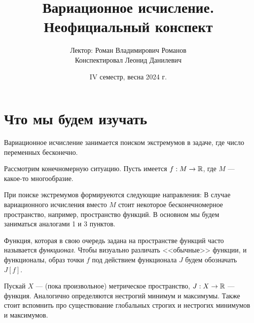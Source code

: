 \documentclass[a4paper]{article}
\date{IV семестр, весна 2024 г.}
\title{Вариационное исчисление. Неофициальный конспект}
\author{Лектор: Роман Владимирович Романов \\ Конспектировал Леонид Данилевич}
\begin{document}
    \maketitle
    \tableofcontents
    \newpage
    \setcounter{lection}{0}
    \section{Что мы будем изучать}
    Вариационное исчисление занимается поиском экстремумов в задаче, где число переменных бесконечно.

    Рассмотрим конечномерную ситуацию.
    Пусть имеется $f: M \rightarrow \mathbb{R}$, где $M$ --- какое-то многообразие.

    При поиске экстремумов формируеются следующие направления:
    В случае вариационного исчисления вместо $M$ стоит некоторое бесконечномерное пространство, например, пространство функций.
    В основном мы будем заниматься аналогами 1 и 3 пунктов.

    Функция, которая в свою очередь задана на пространстве функций часто называется \emph{функционал}.
    Чтобы визуально различать <<обычные>> функции, и функционалы, образ точки $f$ под действием функционала $J$ будем обозначать $J[f]$.

    Пускай $X$ --- (пока произвольное) метрическое пространство, $J: X \rightarrow \mathbb{R}$ --- функция.
    Аналогично определяются нестрогий минимум и максимумы.
    Также стоит вспомнить про существование глобальных строгих и нестрогих минимумов и максимумов.
\end{document}

